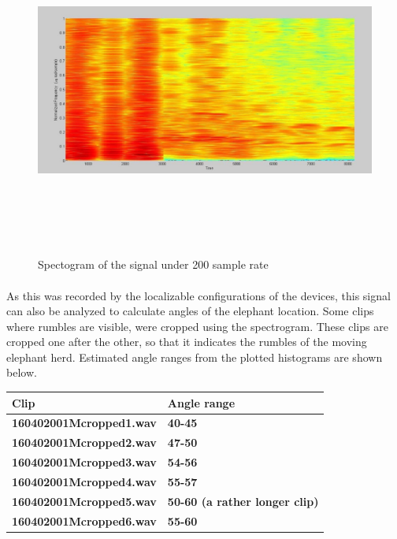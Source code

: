\documentclass[12pt]{article}
\numberwithin{figure}{section}
\numberwithin{table}{section}
\begin{document}
\begin{figure}[H]
\centering
\includegraphics[width=14cm,height=11cm,keepaspectratio]{200.png}
\caption{Spectogram of the signal under 200 sample rate}
\label{d:200}
\end{figure}

\paragraph{}
As this was recorded by the localizable configurations of the devices, this signal can also be analyzed to calculate angles of the elephant location. Some clips where rumbles are visible, were cropped using the spectrogram. These clips are cropped one after the other, so that it indicates the rumbles of the moving elephant herd. Estimated angle ranges from the plotted histograms are shown below.

\begin{table}[H]
\centering
\begin{tabular}{|m{}|m{}|} 
\hline
\bf {Clip} &  {\bf{Angle range}}\\
\hline
\hline
\bf {160402001Mcropped1.wav } &  {\bf{ 40-45  }} \\
\hline
\bf {160402001Mcropped2.wav } &  {\bf{47-50}} \\
\hline
\bf {160402001Mcropped3.wav} &  {\bf{  54-56}} \\
\hline
\bf {160402001Mcropped4.wav} &  {\bf{ 55-57 }} \\
\hline
\bf {160402001Mcropped5.wav } &  {\bf{  50-60   (a rather longer clip) }} \\
\hline
\bf {160402001Mcropped6.wav} &  {\bf{ 55-60}} \\
\hline
\end{tabular}
\end{table}
\end{document}
